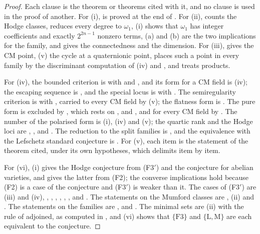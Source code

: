 \begin{proof}
Each clause is the theorem or theorems cited with it, and no clause is used
in the proof of another. For (i),  is proved at the end of
. For (ii),  counts the Hodge
classes,  reduces every degree to $\omega_{1}$,
(i) shows that $\omega_{1}$ has integer coefficients
and exactly $2^{2n-1}$ nonzero terms, (a) and (b) are the
two implications for the family, and  gives the
connectedness and the dimension. For (iii),  gives the
CM point, (v) the cycle at a quaternionic point,
 places such a point in every family by the
discriminant computation of (iv) and ,
and  treats products.

For (iv), the bounded criterion is  with
 and , and its form for a CM field
is (iv); the escaping sequence is ,
and the special locus is  with
. The semiregularity criterion is
 with , carried to every CM field
by (v); the flatness form is . The
pure form is excluded by , which rests on
,  and
, and for every CM field by
. The number of the polarised form is
(i),
(iv) and (v); the quartic rank and the Hodge loci are
, , 
and . The reduction to the split families is
, and the equivalence with the Lefschetz standard
conjecture is . For (v), each item is the statement of
the theorem cited, under its own hypotheses, which  delimits
item by item.

For (vi), (i) gives the Hodge conjecture from
\textup{(F3$'$)} and the conjecture for abelian varieties, and
 gives the latter from \textup{(F2)}; the converse
implications hold because \textup{(F2)} is a case of the conjecture and
\textup{(F3$'$)} is weaker than it. The cases of \textup{(F3$'$)} are
(iii) and (iv), ,
, ,
, ,
,  and .
The statements on
the Mumford classes are , (ii) and
. The statements on the families are
,  and . The
minimal sets are (ii) with
the rule of  adjoined, as computed in ,
and (vi) shows that $\{\mathrm{F3}\}$ and
$\{\mathrm{L},\mathrm{M}\}$ are each equivalent to the conjecture.
\end{proof}

